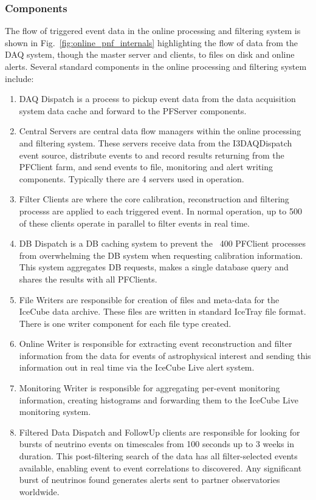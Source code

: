 \subsubsection{Components}
The flow of triggered event data in the online processing and filtering system is shown in Fig.~\ref{fig:online_pnf_internals}
highlighting the flow of data from the DAQ system, though the master server and clients, to files on disk and
online alerts.  Several standard components in the online processing and filtering system include:
\begin{enumerate}
\item DAQ Dispatch is a process to pickup event data from the data acquisition system data cache and forward to
the PFServer components.
\item Central Servers are central data flow managers within the  online processing and filtering system.  These servers 
receive data from the I3DAQDispatch event source, distribute events to and record results returning from the PFClient farm,
and send events to file, monitoring and alert writing components.  Typically there are 4 servers used
in operation.
\item Filter Clients are where the core calibration, reconstruction and filtering processs are applied to each triggered event.  
In normal operation, up to 500 of these clients operate in parallel to filter events in real time.
\item DB Dispatch is a DB caching system to prevent the ~400 PFClient processes from overwhelming the 
DB system when requesting calibration information.  This system aggregates DB requests, makes a single
database query and shares the results with all PFClients.
\item File Writers are responsible for creation of files and meta-data for the IceCube data archive.  These
files are written in standard IceTray file format.  There is one writer component for each file type created.
\item Online Writer is responsible for extracting event reconstruction and filter information from the data for events of astrophysical interest 
and sending this information out  in real time via the IceCube Live alert system.
\item Monitoring Writer is responsible for aggregating per-event monitoring information, creating histograms
and forwarding them to the IceCube Live monitoring system.  
\item Filtered Data Dispatch and FollowUp clients are responsible for looking for bursts of neutrino events on timescales from 100 seconds up to
3 weeks in duration. This post-filtering search of the data has all filter-selected events available, enabling event to event correlations to discovered.  Any 
significant burst of neutrinos found generates alerts sent to partner observatories worldwide.
\end{enumerate}

